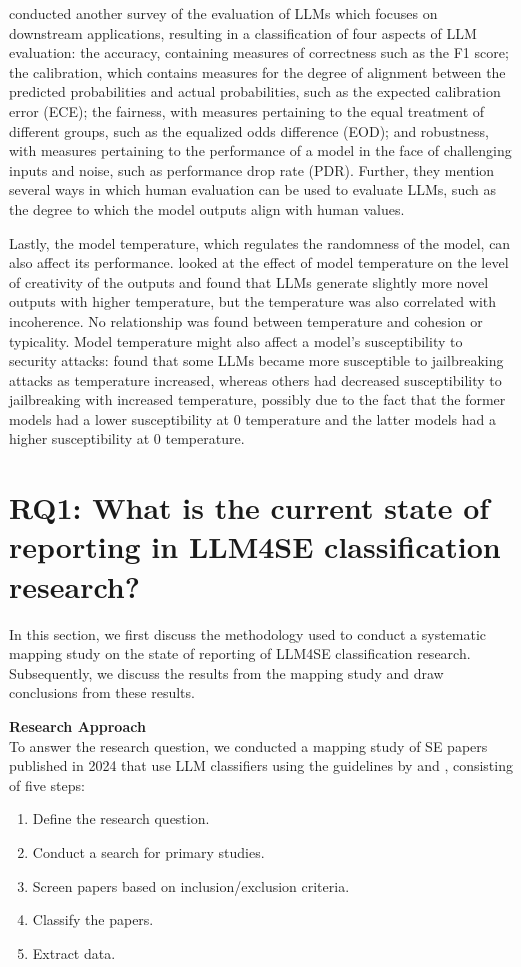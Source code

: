 \documentclass[a4paper]{article}
\begin{document}
\textcite{chang2023} conducted another survey of the evaluation of LLMs which focuses on downstream applications, resulting in a classification of four aspects of LLM evaluation: the accuracy, containing measures of correctness such as the F1 score; the calibration, which contains measures for the degree of alignment between the predicted probabilities and actual probabilities, such as the expected calibration error (ECE); the fairness, with measures pertaining to the equal treatment of different groups, such as the equalized odds difference (EOD); and robustness, with measures pertaining to the performance of a model in the face of challenging inputs and noise, such as performance drop rate (PDR). Further, they mention several ways in which human evaluation can be used to evaluate LLMs, such as the degree to which the model outputs align with human values.

Lastly, the model temperature, which regulates the randomness of the model, can also affect its performance. \textcite{peeperkorn2024} looked at the effect of model temperature on the level of creativity of the outputs and found that LLMs generate slightly more novel outputs with higher temperature, but the temperature was also correlated with incoherence. No relationship was found between temperature and cohesion or typicality. Model temperature might also affect a model's susceptibility to security attacks: \textcite{Yu2024} found that some LLMs became more susceptible to jailbreaking attacks as temperature increased, whereas others had decreased susceptibility to jailbreaking with increased temperature, possibly due to the fact that the former models had a lower susceptibility at 0 temperature and the latter models had a higher susceptibility at 0 temperature.


\section{RQ1: What is the current state of reporting in LLM4SE classification research?}
\label{RQ1}

In this section, we first discuss the methodology used to conduct a systematic mapping study on the state of reporting of LLM4SE classification research. Subsequently, we discuss the results from the mapping study and draw conclusions from these results.

\textbf{Research Approach}\\
To answer the research question, we conducted a mapping study of SE papers published in 2024 that use LLM classifiers using the guidelines by \citeauthor{kitchenham2011} \cite{kitchenham2011,kitchenham2007} and \textcite{petersen2008map}, consisting of five steps:
\begin{enumerate}
	\item Define the research question.
	\item Conduct a search for primary studies.
	\item Screen papers based on inclusion/exclusion criteria.
	\item Classify the papers.
	\item Extract data. 
\end{enumerate}
\end{document}
